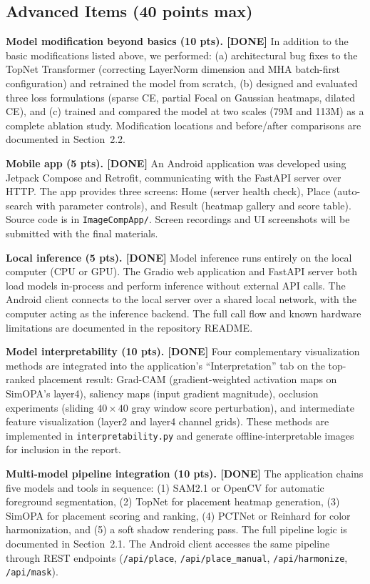 \documentclass[10pt,twocolumn]{article}
\begin{document}
\subsection{Advanced Items (40 points max)}

\textbf{Model modification beyond basics (10 pts). [DONE]} In addition to the basic modifications listed above, we performed: (a) architectural bug fixes to the TopNet Transformer (correcting LayerNorm dimension and MHA batch-first configuration) and retrained the model from scratch, (b) designed and evaluated three loss formulations (sparse CE, partial Focal on Gaussian heatmaps, dilated CE), and (c) trained and compared the model at two scales (79M and 113M) as a complete ablation study. Modification locations and before/after comparisons are documented in Section~2.2.

\textbf{Mobile app (5 pts). [DONE]} An Android application was developed using Jetpack Compose and Retrofit, communicating with the FastAPI server over HTTP. The app provides three screens: Home (server health check), Place (auto-search with parameter controls), and Result (heatmap gallery and score table). Source code is in \texttt{ImageCompApp/}. Screen recordings and UI screenshots will be submitted with the final materials.

\textbf{Local inference (5 pts). [DONE]} Model inference runs entirely on the local computer (CPU or GPU). The Gradio web application and FastAPI server both load models in-process and perform inference without external API calls. The Android client connects to the local server over a shared local network, with the computer acting as the inference backend. The full call flow and known hardware limitations are documented in the repository README.

\textbf{Model interpretability (10 pts). [DONE]} Four complementary visualization methods are integrated into the application's ``Interpretation'' tab on the top-ranked placement result: Grad-CAM (gradient-weighted activation maps on SimOPA's layer4), saliency maps (input gradient magnitude), occlusion experiments (sliding $40\times 40$ gray window score perturbation), and intermediate feature visualization (layer2 and layer4 channel grids). These methods are implemented in \texttt{interpretability.py} and generate offline-interpretable images for inclusion in the report.

\textbf{Multi-model pipeline integration (10 pts). [DONE]} The application chains five models and tools in sequence: (1) SAM2.1 or OpenCV for automatic foreground segmentation, (2) TopNet for placement heatmap generation, (3) SimOPA for placement scoring and ranking, (4) PCTNet or Reinhard for color harmonization, and (5) a soft shadow rendering pass. The full pipeline logic is documented in Section~2.1. The Android client accesses the same pipeline through REST endpoints (\texttt{/api/place}, \texttt{/api/place\_manual}, \texttt{/api/harmonize}, \texttt{/api/mask}).
\end{document}
